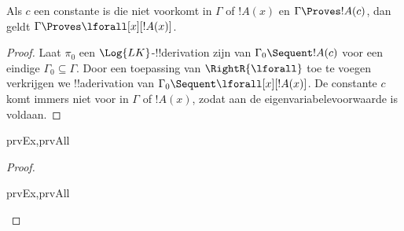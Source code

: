 \documentclass[openany]{memoir}
\begin{document}
\begin{thm}
 Als $c$ een constante is die niet
voorkomt in $\Gamma$ of $!A(x)$ en $\Gamma \Proves !A(c)$, dan geldt
$\Gamma \Proves \lforall[x][!A(x)]$.
\end{thm}

\begin{proof}
Laat $\pi_0$ een $\Log{LK}$-!!{derivation} zijn van $\Gamma_0 \Sequent
!A(c)$ voor een eindige $\Gamma_0 \subseteq \Gamma$. Door een
toepassing van $\RightR{\lforall}$ toe te voegen verkrijgen we
!!a{derivation} van $\Gamma_0 \Sequent \lforall[x][!A(x)]$. De
constante $c$ komt immers niet voor in $\Gamma$ of $!A(x)$, zodat aan
de eigenvariabelevoorwaarde is voldaan.
\end{proof}

\begin{prop}
\begin{tagenumerate}{prvEx,prvAll}
\end{tagenumerate}
\end{prop}

\begin{proof}
\begin{tagenumerate}{prvEx,prvAll}
\end{tagenumerate}
\end{proof}
\endgroup

\begingroup
\def\olfilename{OLP-0081}
\def\olfilepath{content/first-order-logic/sequent-calculus/}
\hypertarget{unit-OLP-0081}{}
\end{document}
